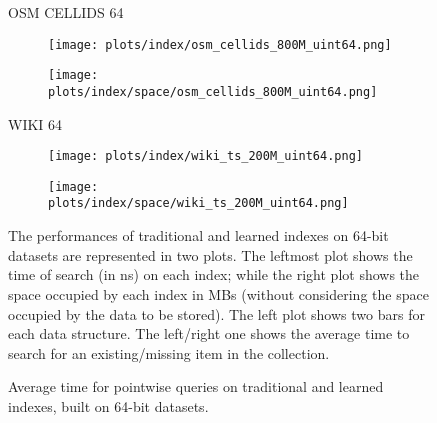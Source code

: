 \documentclass{article}
\begin{document}
\begin{figure}[!htbp]
{\begin{minipage}[t][0.98\textheight][t]{\textwidth}
    \begin{minipage}{0.05\linewidth}
    \begin{sideways}\small OSM CELLIDS 64\end{sideways}
    \end{minipage}
    \begin{minipage}{0.32\linewidth}
        \begin{figure}[H]
        \texttt{[image: plots/index/osm\_cellids\_800M\_uint64.png]}
        \end{figure}
    \end{minipage}
    \begin{minipage}{0.32\linewidth}
        \begin{figure}[H]
            \texttt{[image: plots/index/space/osm\_cellids\_800M\_uint64.png]}
        \end{figure}
    \end{minipage}
    \vspace*{-15px}

    \begin{minipage}{0.05\linewidth}
    \begin{sideways}\small WIKI 64\end{sideways}
    \end{minipage}
    \begin{minipage}{0.32\linewidth}
        \begin{figure}[H]
        \texttt{[image: plots/index/wiki\_ts\_200M\_uint64.png]}
        \end{figure}
    \end{minipage}
    \begin{minipage}{0.32\linewidth}
        \begin{figure}[H]
            \texttt{[image: plots/index/space/wiki\_ts\_200M\_uint64.png]}
        \end{figure}
    \end{minipage}
    \vfill
    
    \centering
    \begin{minipage}{\linewidth}
        The performances of traditional and learned indexes on 64-bit datasets are represented in two plots. The leftmost plot shows the time of search (in ns) on each index; while the right plot shows the space occupied by each index in MBs (without considering the space occupied by the data to be stored). The left plot shows two bars for each data structure. The left/right one shows the average time to search for an existing/missing item in the collection.
    \end{minipage}
    \vspace{10px}
\end{minipage}
}
\caption{Average time for pointwise queries on traditional and learned indexes, built on 64-bit datasets.}
\end{figure}
\end{document}
